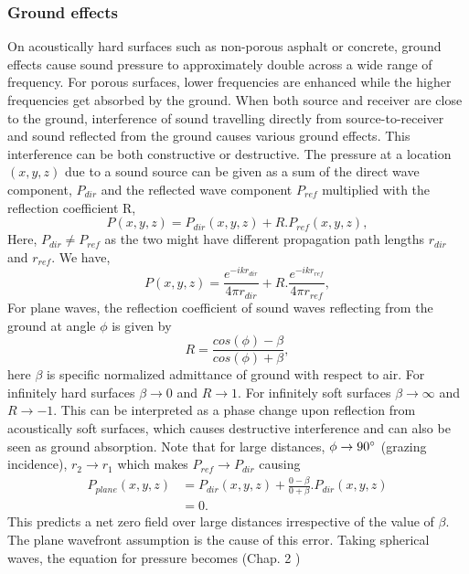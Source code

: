 \subsubsection{Ground effects}
On acoustically hard surfaces such as non-porous asphalt or concrete, ground effects cause sound pressure to approximately double across a wide range of frequency. For porous surfaces, lower frequencies are enhanced while the higher frequencies get absorbed by the ground. When both source and receiver are close to the ground, interference of sound travelling directly from  source-to-receiver and sound reflected from the ground causes various ground effects. This interference can be both constructive or destructive. The pressure at a location $(x,y,z)$ due to a sound source can be given as a sum of the direct wave component, $P_{dir}$ and the reflected wave component $P_{ref}$ multiplied with the reflection coefficient R,
\begin{equation}
    P(x,y,z)=P_{dir}(x,y,z)+R.P_{ref}(x,y,z),    
\end{equation}
Here, $P_{dir} \neq P_{ref}$ as the two might have different propagation path lengths $r_ {dir}$ and $r_{ref}$. We have,
\begin{equation}
    P(x,y,z)=\frac{e^{-ikr_{dir}}}{4\pi r_{dir}} + R.\frac{e^{-ikr_{ref}}}{4\pi r_{ref}},
\end{equation}
For plane waves, the reflection coefficient of sound waves reflecting from the ground at angle $\phi$ is given by
\begin{equation}
    R = \frac{cos (\phi) - \beta}{cos (\phi) + \beta},
\end{equation}
here $\beta$ is specific normalized admittance of ground with respect to air. For infinitely hard surfaces $\beta \to 0$ and $R \to 1$. For infinitely soft surfaces  $\beta \to \infty$ and $R \to -1$. This can be interpreted as a phase change upon reflection from acoustically soft surfaces, which causes destructive interference and can also be seen as ground absorption. Note that for large distances, $\phi \to 90\degree$ (grazing incidence),  $r_2 \to r_1$ which makes $P_{ref} \to P_{dir}$ causing
\begin{equation}
\begin{split}
    P_{plane}(x,y,z)&=P_{dir}(x,y,z)+ \frac{0-\beta}{0+\beta}.P_{dir}(x,y,z)\\
            &=0.
\end{split}
\end{equation}
This predicts a net zero field over large distances irrespective of the value of $\beta$. The plane wavefront assumption is the cause of this error. Taking spherical waves, the equation for pressure becomes (Chap. 2 \cite{attenborough2006predicting})
